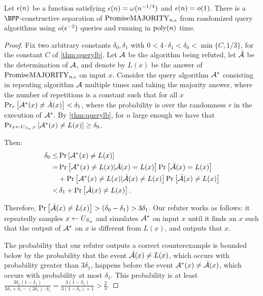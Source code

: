 \begin{theorem}
\label{thm:qarandomizedcs}
Let $\epsilon(n)$ be a function satisfying $\epsilon(n) = \omega(n^{-1/4})$ and $\epsilon(n) = o(1)$. 
There is a $\BPP$-constructive separation of $\mathrm{PromiseMAJORITY}_{n, \epsilon}$ from randomized query algorithms
using $o(\epsilon^{-2})$ queries and running in $\text{poly}(n)$ time. 
\end{theorem}
\begin{proof}
    Fix two arbitrary constants $\delta_0, \delta_1$ with $0 < 4 \cdot \delta_1 < \delta_0 < \min \{C, 1/3\}$, 
    for the constant $C$ of \cref{thm:querylb}.
    Let $\mathcal{A}$ be the algorithm being refuted, let $\bar{\mathcal{A}}$ be the determination
    of $\mathcal{A}$, and denote by $L(x)$ be the answer of $\mathrm{PromiseMAJORITY}_{n, \epsilon}$ on input $x$. 
    Consider the query algorithm $\mathcal{A}^*$ consisting in repeating algorithm $\mathcal{A}$  multiple times and 
    taking the majority answer, where the number of repetitions is a constant such
    that for all $x$ $\text{Pr}_{r}\left[\mathcal{A}^*(x) \neq \bar{A}(x)\right] < \delta_1$, where the 
    probability is over the randomness $r$ in the execution of $\mathcal{A}^*$. 
    By \cref{thm:querylb},
    for $n$ large enough we have that $\text{Pr}_{x \leftarrow U_{S_n}, r}\left[\mathcal{A}^*(x) \neq L(x)\right] \geq \delta_0$.

    Then:
    \begin{align*}
    \delta_0  \le & \,  \text{Pr}\left[\mathcal{A}^*(x) \neq L(x)\right] \\
          = & \,  \text{Pr}\left[\mathcal{A}^*(x) \neq L(x) | \bar{\mathcal{A}}(x) = L(x)\right] \text{Pr}\left[\bar{\mathcal{A}}(x) = L(x)\right] \\
         &  + \text{Pr}\left[\mathcal{A}^*(x) \neq L(x) | \bar{\mathcal{A}}(x) \neq L(x)\right] \text{Pr}\left[\bar{\mathcal{A}}(x) \neq L(x)\right] \\
         < & \, \delta_1 + \text{Pr}\left[\bar{\mathcal{A}}(x) \neq L(x)\right].
    \end{align*}

    Therefore, $\text{Pr}\left[\bar{\mathcal{A}}(x) \neq L(x)\right] > (\delta_0 - \delta_1) > 3 \delta_1$. Our refuter works
    as follows: it repeatedly samples $x \leftarrow U_{S_n}$ and simulates $\mathcal{A}^*$ on input $x$ until it finds an
    $x$ such that the output of $\mathcal{A}^*$ on $x$ is different from $L(x)$, and outputs that $x$. 
    
    The probability that our refuter outputs a correct counterexample is bounded below by the probability 
    that the event $\bar{\mathcal{A}}(x) \neq L(x)$, which occurs with probability greater than $3 \delta_1$,
    happens before the event $\mathcal{A}^*(x) \neq \bar{\mathcal{A}}(x)$, which occurs with probability at most $\delta_1$. 
    This probability is at least 
    $\frac{3\delta_1 (1-\delta_1)}{3\delta_1 + \delta_1 - (3\delta_1) \cdot \delta_1} 
    = \frac{3 (1-\delta_1)}{3(1-\delta_1)+ 1} > \frac{2}{3}$. 

        
\end{proof}



